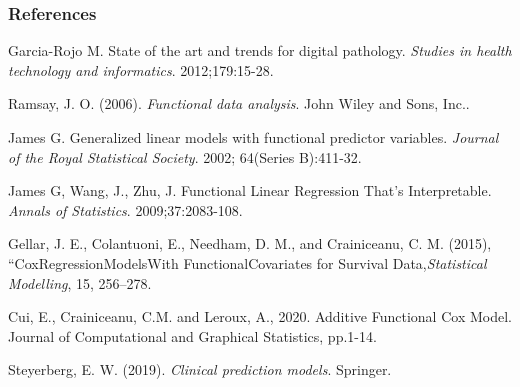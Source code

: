 \documentclass[t,10pt]{beamer}
\begin{document}
	\frame
	{\frametitle {References}  
		
		\begin{thebibliography}{ }
			
			Garcia-Rojo M. State of the art and trends for digital pathology. \textit{Studies in health technology and informatics}. 2012;179:15-28.
								
			Ramsay, J. O. (2006). \textit{Functional data analysis}. John Wiley and Sons, Inc..
			
			James G. Generalized linear models with functional predictor variables. \textit{Journal of the Royal Statistical Society}. 2002; 64(Series B):411-32.
			
			James G, Wang, J., Zhu, J. Functional Linear Regression That's Interpretable. \textit{Annals of Statistics}. 2009;37:2083-108.
			
		Gellar, J. E., Colantuoni, E., Needham, D. M., and Crainiceanu, C. M. (2015), “CoxRegressionModelsWith FunctionalCovariates for Survival Data,\textit{Statistical Modelling}, 15, 256–278.
			
		Cui, E., Crainiceanu, C.M. and Leroux, A., 2020. Additive Functional Cox Model. Journal of Computational and Graphical Statistics, pp.1-14.
						
			Steyerberg, E. W. (2019). \textit{Clinical prediction models}.  Springer.
			
		\end{thebibliography}
	}
\end{document}
